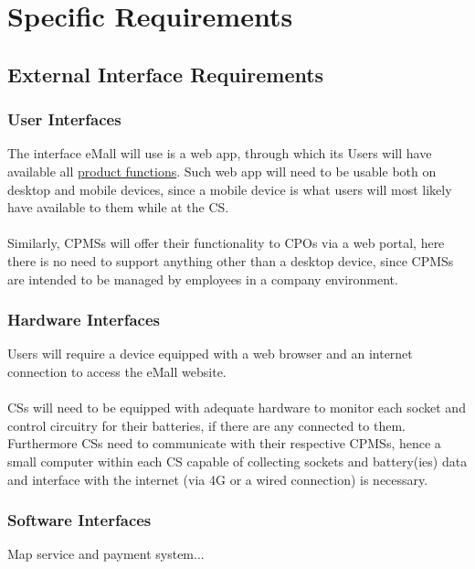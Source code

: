 \documentclass[11pt]{article}
\begin{document}
\section{Specific Requirements}
\label{section:specificRequirements}

\subsection{External Interface Requirements}

\subsubsection{User Interfaces}

The interface eMall will use is a web app, through which its Users will have available all \hyperref[subsec:prodfunctions]{product functions}. Such web app will need to be usable both on desktop and mobile devices, since a mobile device is what users will most likely have available to them while at the CS. \\
\\
Similarly, CPMSs will offer their functionality to CPOs via a web portal, here there is no need to support anything other than a desktop device, since CPMSs are intended to be managed by employees in a company environment.

\subsubsection{Hardware Interfaces}

Users will require a device equipped with a web browser and an internet connection to access the eMall website. \\
\\
CSs will need to be equipped with adequate hardware to monitor each socket and control circuitry for their batteries, if there are any connected to them. Furthermore CSs need to communicate with their respective CPMSs, hence a small computer within each CS capable of collecting sockets and battery(ies) data and interface with the internet (via 4G or a wired connection) is necessary.

\subsubsection{Software Interfaces}

Map service and payment system...
\end{document}
